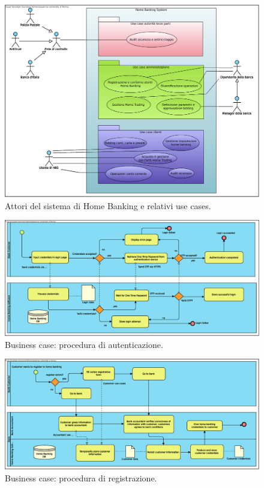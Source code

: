 \documentclass[10pt]{softeng} %
\begin{document}
\begin{figure}[hbt]
	\centering
	\includegraphics[width=\textwidth]{Images/Home_Banking_inception_use_cases.eps}
	\caption{Attori del sistema di Home Banking e relativi use cases.}
	\label{fig:inception_use_cases}
\end{figure}

\begin{figure}[hbt]
	\centering
	\includegraphics[width=\textheight, angle=90]{Images/Authentication.eps}
	\caption{Business case: procedura di autenticazione.}
	\label{fig:business_case_authentication}
\end{figure}

\begin{figure}[hbt]
	\centering
	\includegraphics[width=\textheight, angle=90]{Images/Home_Banking_registration.eps}
	\caption{Business case: procedura di registrazione.}
	\label{fig:business_case_registration}
\end{figure}
\end{document}
